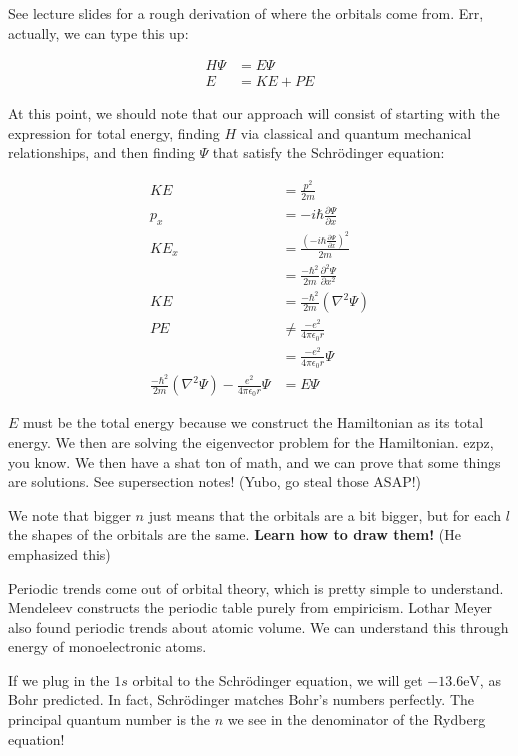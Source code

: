 \documentclass{report}
\begin{document}
See lecture slides for a rough derivation of where the orbitals come from. Err, actually, we can type this up:

\begin{align*}
H \Psi &= E \Psi\\
E &= KE + PE
\end{align*}

At this point, we should note that our approach will consist of starting with the expression for total energy, finding $H$ via classical and quantum mechanical relationships, and then finding $\Psi$ that satisfy the Schr\"odinger equation:

\begin{align*}
KE &= \frac{p^2}{2m}\\
p_x &= -i\hbar \frac{\partial \Psi}{\partial x}\\
KE_x &= \frac{\left(-i\hbar \frac{\partial \Psi}{\partial x}\right)^2}{2m}\\
&= \frac{-\hbar^2}{2m}\frac{\partial^2 \Psi}{\partial x^2}\\
KE &= \frac{-\hbar^2}{2m}(\nabla^2 \Psi)\\[10pt]
PE &\neq \frac{-e^2}{4\pi\epsilon_0 r}\\
&= \frac{-e^2}{4\pi\epsilon_0 r}\Psi\\[10pt]
\frac{-\hbar^2}{2m}(\nabla^2 \Psi) - \frac{e^2}{4\pi\epsilon_0 r}\Psi &= E\Psi
\end{align*}

$E$ must be the total energy because we construct the Hamiltonian as its total energy. We then are solving the eigenvector problem for the Hamiltonian. ezpz, you know. We then have a shat ton of math, and we can prove that some things are solutions. See supersection notes! (Yubo, go steal those ASAP!)

We note that bigger $n$ just means that the orbitals are a bit bigger, but for each $l$ the shapes of the orbitals are the same. \textbf{Learn how to draw them!}  (He emphasized this)

Periodic trends come out of orbital theory, which is pretty simple to understand. Mendeleev constructs the periodic table purely from empiricism. Lothar Meyer also found periodic trends about atomic volume. We can understand this through energy of monoelectronic  atoms.

If we plug in the $1s$ orbital to the Schr\"odinger equation, we will get $-13.6 \mathrm{eV}$, as Bohr predicted. In fact, Schr\"odinger matches Bohr's numbers perfectly. The principal quantum number is the $n$ we see in the denominator of the Rydberg equation!
\end{document}
